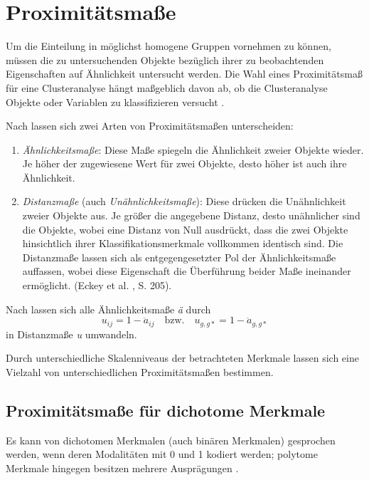 \chapter{Proximitätsmaße}

Um die Einteilung in möglichst homogene Gruppen vornehmen zu können, müssen die zu untersuchenden Objekte bezüglich ihrer zu beobachtenden Eigenschaften auf Ähnlichkeit untersucht werden. Die Wahl eines Proximitätsmaß für eine Clusteranalyse hängt maßgeblich davon ab, ob die Clusteranalyse Objekte oder Variablen zu klassifizieren versucht \citep[Vgl.][S. 196]{Bacher.2010}.

Nach \citet{Backhaus.2016} lassen sich zwei Arten von Proximitätsmaßen unterscheiden:

\begin{enumerate}
	\item \textit{Ähnlichkeitsmaße}: Diese Maße spiegeln die Ähnlichkeit zweier Objekte wieder. Je höher der zugewiesene Wert für zwei Objekte, desto höher ist auch ihre Ähnlichkeit.
	\item \textit{Distanzmaße} (auch \textit{Unähnlichkeitsmaße}): Diese drücken die Unähnlichkeit zweier Objekte aus. Je größer die angegebene Distanz, desto unähnlicher sind die Objekte, wobei eine Distanz von Null ausdrückt, dass die zwei Objekte hinsichtlich ihrer Klassifikationsmerkmale vollkommen identisch sind. Die Distanzmaße lassen sich als entgegengesetzter Pol der Ähnlichkeitsmaße auffassen, wobei diese Eigenschaft die Überführung beider Maße ineinander ermöglicht. (Eckey et al. \cite{Eckey.2002}, S. 205).
\end{enumerate}

Nach \citet[S. 200]{Bacher.2010} lassen sich alle Ähnlichkeitsmaße \textit{ä} durch 
\begin{equation}
u_{ij} = 1 - \ddot{a}_{ij} \quad \text{bzw.} \quad u_{g,g*} = 1- \ddot{a}_{g,g*}
\end{equation}
in Distanzmaße \textit{u} umwandeln.

Durch unterschiedliche Skalenniveaus der betrachteten Merkmale lassen sich eine Vielzahl von unterschiedlichen Proximitätsmaßen bestimmen.

\section{Proximitätsmaße für dichotome Merkmale}
Es kann von dichotomen Merkmalen (auch binären Merkmalen) gesprochen werden, wenn deren Modalitäten mit 0 und 1 kodiert werden; polytome Merkmale hingegen besitzen mehrere Ausprägungen \citep[Vgl.][S. 218]{Eckey.2002}. 


